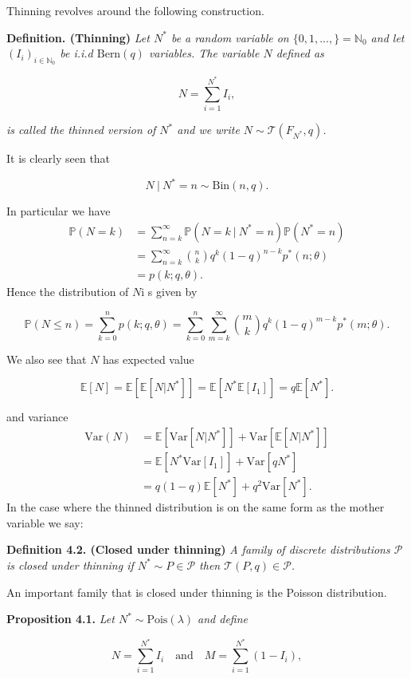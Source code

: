 \documentclass[a4paper,10pt,openany]{book}
\begin{document}
Thinning revolves around the following construction.

\textbf{Definition. (Thinning)} \emph{Let \(N^*\) be a random variable on \(\{0,1,...,\}=\mathbb N_0\) and let \((I_i)_{i\in\mathbb N_0}\) be i.i.d \(\text{Bern}(q)\) variables. The variable \(N\) defined as}

\[
N=\sum_{i=1}^{N^*} I_i,
\]

\emph{is called the thinned version of \(N^*\) and we write \(N\sim \mathcal T(F_{N^*},q)\).}

It is clearly seen that

\[
N\ \vert\ N^*=n \sim \text{Bin}(n,q).
\]

In particular we have
\begin{align*}
\mathbb P(N=k)&=\sum_{n=k}^\infty \mathbb P(N = k\ \vert\ N^* = n)\mathbb P(N^*=n)\\
&=\sum_{n=k}^\infty {n\choose k} q^k(1-q)^{n-k}p^*(n;\theta)\\
&=p(k;q,\theta).
\end{align*}
Hence the distribution of \(N\)i s given by

\[
\mathbb P(N\le n)=\sum_{k=0}^n p(k;q,\theta)=\sum_{k=0}^n\sum_{m=k}^\infty {m\choose k} q^k(1-q)^{m-k}p^*(m;\theta).
\]

We also see that \(N\) has expected value

\[
\mathbb E[N]=\mathbb E[\mathbb E[N\vert N^*]]=\mathbb E[N^*\mathbb E[I_1]]=q\mathbb E[N^*].
\]

and variance
\begin{align*}
\text{Var}(N)&=\mathbb E[\text{Var}[N\vert N^*]]+\text{Var}[\mathbb E[N\vert N^*]]\\
&=\mathbb E[N^*\text{Var}[I_1]]+\text{Var}[qN^*]\\
&=q(1-q)\mathbb E[N^*] + q^2 \text{Var}[N^*].
\end{align*}
In the case where the thinned distribution is on the same form as the mother variable we say:

\textbf{Definition 4.2. (Closed under thinning)} \emph{A family of discrete distributions \(\mathcal P\) is closed under thinning if \(N^*\sim P\in \mathcal P\) then \(\mathcal T(P,q)\in\mathcal P\).}

An important family that is closed under thinning is the Poisson distribution.

\textbf{Proposition 4.1.} \emph{Let \(N^*\sim\text{Pois}(\lambda)\) and define}

\[
N=\sum_{i=1}^{N^*}I_i\quad\text{and}\quad M=\sum_{i=1}^{N^*}(1-I_i),
\]
\end{document}
